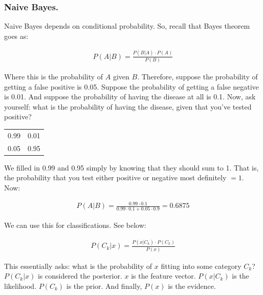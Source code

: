 \subsubsection{Naive Bayes.}

Naive Bayes depends on conditional probability. So, recall that Bayes theorem goes as: 

\begin{equation}
\begin{split}
    P(A | B) = \frac{P(B | A) \cdot P(A)}{P(B)}
\end{split}
\end{equation}

Where this is the probability of $A$ given $B$. Therefore, suppose the probability of getting a false positive is 0.05. Suppose the probability of getting a false negative is 0.01. And suppose the probability of having the disease at all is 0.1. Now, ask yourself: what is the probability of having the disease, given that you've tested positive? 

\begin{table}[]
    \centering
    \begin{tabular}{c|c}
       0.99  & 0.01 \\
       0.05  & 0.95
    \end{tabular}
\end{table}

We filled in 0.99 and 0.95 simply by knowing that they should sum to 1. That is, the probability that you test either positive or negative most definitely $=1$.  Now: 

\begin{equation}
\begin{split}
    P(A | B) = \frac{0.99 \cdot 0.1}{0.99 \cdot 0.1 + 0.05\cdot 0.9} = 0.6875
\end{split}
\end{equation}

We can use this for classifications. See below: 

\begin{equation}
\begin{split}
    P(C_k | x) = \frac{P(x | C_k) \cdot P(C_k)}{P(x)}
\end{split}
\end{equation}

This essentially asks: what is the probability of $x$ fitting into some category $C_k$? $P(C_k | x)$ is considered the posterior. $x$ is the feature vector. $P(x | C_k)$ is the likelihood. $P(C_k)$ is the prior. And finally, $P(x)$ is the evidence. 

